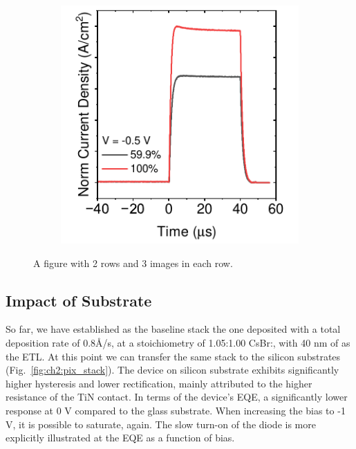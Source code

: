 \begin{figure}[htbp]
\begin{subfigure}[b]{0.28\textwidth}
        \caption{}
    \end{subfigure}
    \hfill
    \begin{subfigure}[b]{0.28\textwidth}
        \centering
        \includegraphics[width=\textwidth]{chapters/material_properties/images/tpc-12CsBr.pdf}
        \caption{}
    \end{subfigure}

    \caption{A figure with 2 rows and 3 images in each row.}
    \label{fig:two_rows_three_columns}
\end{figure}

\subsection{Impact of Substrate}

So far, we have established as the baseline stack the one deposited with a total deposition rate of 0.8{\AA}/s, at a stoichiometry of 1.05:1.00 CsBr:, with 40 nm of  as the ETL. At this point we can transfer the same stack to the silicon substrates (Fig.~\ref{fig:ch2:pix_stack}). 
The device on silicon substrate exhibits significantly higher hysteresis and lower rectification, mainly attributed to the higher resistance of the TiN contact. In terms of the device's EQE, a significantly lower response at 0 V compared to the glass substrate. When increasing the bias to -1 V, it is possible to saturate, again. The slow turn-on of the diode is more explicitly illustrated at the EQE as a function of bias. 



